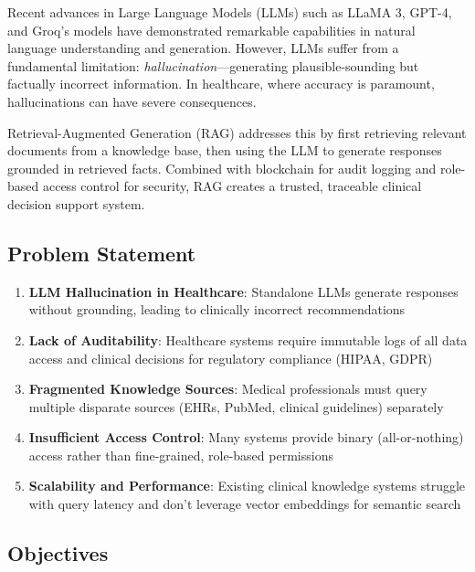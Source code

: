 \documentclass[12pt,singleside,a4paper]{article}
\begin{document}
Recent advances in Large Language Models (LLMs) such as LLaMA 3, GPT-4, and Groq's models have demonstrated remarkable capabilities in natural language understanding and generation. However, LLMs suffer from a fundamental limitation: \textit{hallucination}---generating plausible-sounding but factually incorrect information. In healthcare, where accuracy is paramount, hallucinations can have severe consequences.

Retrieval-Augmented Generation (RAG) addresses this by first retrieving relevant documents from a knowledge base, then using the LLM to generate responses grounded in retrieved facts. Combined with blockchain for audit logging and role-based access control for security, RAG creates a trusted, traceable clinical decision support system.

\subsection{Problem Statement}

\begin{enumerate}
\item \textbf{LLM Hallucination in Healthcare}: Standalone LLMs generate responses without grounding, leading to clinically incorrect recommendations
\item \textbf{Lack of Auditability}: Healthcare systems require immutable logs of all data access and clinical decisions for regulatory compliance (HIPAA, GDPR)
\item \textbf{Fragmented Knowledge Sources}: Medical professionals must query multiple disparate sources (EHRs, PubMed, clinical guidelines) separately
\item \textbf{Insufficient Access Control}: Many systems provide binary (all-or-nothing) access rather than fine-grained, role-based permissions
\item \textbf{Scalability and Performance}: Existing clinical knowledge systems struggle with query latency and don't leverage vector embeddings for semantic search
\end{enumerate}

\subsection{Objectives}
\end{document}
